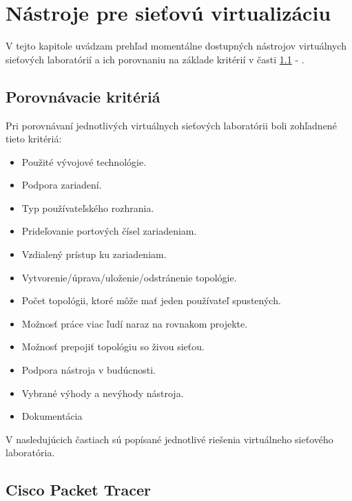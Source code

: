 \chapter{Nástroje pre sieťovú virtualizáciu}
\label{chap:nastroje_pre_siet_virt}

V tejto kapitole uvádzam prehľad momentálne dostupných nástrojov virtuálnych sieťových laboratórií a ich porovnaniu na základe kritérií v časti \ref{chap:porovnavacie_kriteria} - .





\section{Porovnávacie kritériá}
\label{chap:porovnavacie_kriteria}

Pri porovnávaní jednotlivých virtuálnych sieťových laboratórii boli zohľadnené tieto kritériá:
\begin{itemize}[noitemsep]
    \item Použité vývojové technológie.
    \item Podpora zariadení.
    \item Typ používateľského rozhrania.
    \item Prideľovanie portových čísel zariadeniam.
    \item Vzdialený prístup ku zariadeniam.
    \item Vytvorenie/úprava/uloženie/odstránenie topológie.
    \item Počet topológii, ktoré môže mať jeden používateľ spustených.
    \item Možnosť práce viac ľudí naraz na rovnakom projekte.
    \item Možnosť prepojiť topológiu so živou sieťou.
    \item Podpora nástroja v budúcnosti.
    \item Vybrané výhody a nevýhody nástroja.
    \item Dokumentácia
\end{itemize}

V nasledujúcich častiach sú popísané jednotlivé riešenia virtuálneho sieťového laboratória.





\section{Cisco Packet Tracer}

